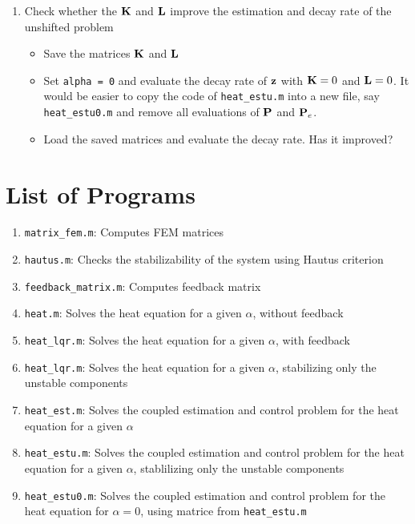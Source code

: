\documentclass[12pt]{article}
\begin{document}
\begin{enumerate}
\item Check whether the ${\mathbf K}$ and ${\mathbf L}$ improve the estimation and decay rate of the unshifted problem 

\begin{itemize}
\item Save the matrices ${\mathbf K}$ and ${\mathbf L}$
    
\item Set {\tt alpha = 0} and evaluate the decay rate of ${\mathbf z}$ with ${\mathbf K} = 0$ and ${\mathbf L}=0$. It would be easier to copy the code of {\tt heat\_estu.m} into a new file, say {\tt heat\_estu0.m} and remove all evaluations of ${\mathbf P}$ and ${\mathbf P}_e$.
    
\item Load the saved matrices and evaluate the decay rate. Has it improved?
\end{itemize}

\end{enumerate}


\section{List of Programs}

\begin{enumerate}

\item {\tt matrix\_fem.m}: Computes FEM matrices

\item {\tt hautus.m}: Checks the stabilizability of the system using Hautus criterion

\item {\tt feedback\_matrix.m}: Computes feedback matrix

\item {\tt heat.m}: Solves the heat equation for a given $\alpha$, without feedback

\item {\tt heat\_lqr.m}: Solves the heat equation for a given $\alpha$, with feedback

\item {\tt heat\_lqr.m}: Solves the heat equation for a given $\alpha$, stabilizing only the unstable components

\item {\tt heat\_est.m}: Solves the coupled estimation and control problem for the heat equation for a given $\alpha$

\item {\tt heat\_estu.m}: Solves the coupled estimation and control problem for the heat equation for a given $\alpha$, stablilizing only the unstable components

\item {\tt heat\_estu0.m}: Solves the coupled estimation and control problem for the heat equation for $\alpha = 0$, using matrice from {\tt heat\_estu.m}

\end{enumerate}
\end{document}
